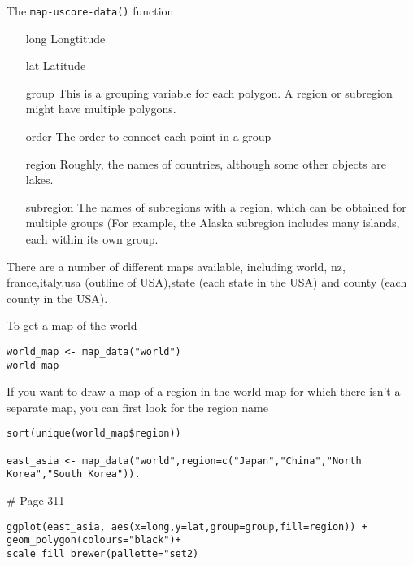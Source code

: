 {%
The \texttt{map-uscore-data()} function

\begin{itemize}
\item[long] Longtitude
\item[lat] Latitude
\item[group] This is a grouping variable for each polygon. A region or subregion might have multiple polygons.
\item[order] The order to connect each point in a group
\item[region] Roughly, the names of countries, although some other objects are lakes.
\item[subregion] The names of subregions with a region, which can be obtained for multiple groups
(For example, the Alaska subregion includes many islands, each within its own group.
\end{itemize}
There are a number of different maps available, including world, nz, france,italy,usa (outline of USA),state (each state in the USA) and county (each county in the USA).


To get a map of the world
\begin{framed}
\begin{verbatim}
world_map <- map_data("world")
world_map
\end{verbatim}
\end{framed}

If you want to draw a map of a region in the world map for which there isn't a separate map, you can
first look for the region name

\begin{framed}
\begin{verbatim}
sort(unique(world_map$region))

east_asia <- map_data("world",region=c("Japan","China","North Korea","South Korea")).

\end{verbatim}
\end{framed}
# Page 311

\begin{framed}
\begin{verbatim}
ggplot(east_asia, aes(x=long,y=lat,group=group,fill=region)) + 
geom_polygon(colours="black")+
scale_fill_brewer(pallette="set2)
\end{verbatim}
\end{framed}


}
